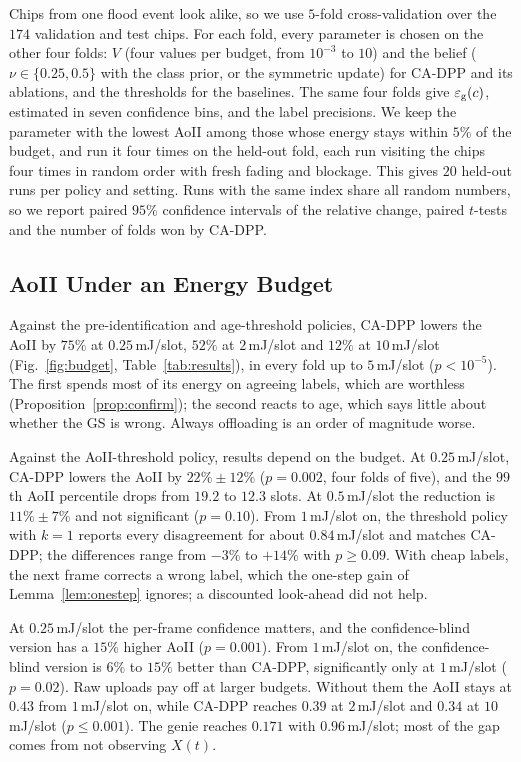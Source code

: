 \documentclass[conference]{IEEEtran}
\theoremstyle{remark}
\newcommand{\ee}{\varepsilon}
\begin{document}
Chips from one flood event look alike, so we use $5$-fold cross-validation over the $174$ validation and test chips. For each fold, every parameter is chosen on the other four folds: $V$ (four values per budget, from $10^{-3}$ to $10$) and the belief ($\nu\in\{0.25,0.5\}$ with the class prior, or the symmetric update) for CA-DPP and its ablations, and the thresholds for the baselines. The same four folds give $\ee_{\rm g}(c)$, estimated in seven confidence bins, and the label precisions. We keep the parameter with the lowest AoII among those whose energy stays within $5\%$ of the budget, and run it four times on the held-out fold, each run visiting the chips four times in random order with fresh fading and blockage. This gives $20$ held-out runs per policy and setting. Runs with the same index share all random numbers, so we report paired $95\%$ confidence intervals of the relative change, paired $t$-tests and the number of folds won by CA-DPP.

\subsection{AoII Under an Energy Budget}
Against the pre-identification and age-threshold policies, CA-DPP lowers the AoII by $75\%$ at $0.25$\,mJ/slot, $52\%$ at $2$\,mJ/slot and $12\%$ at $10$\,mJ/slot (Fig.~\ref{fig:budget}, Table~\ref{tab:results}), in every fold up to $5$\,mJ/slot ($p<10^{-5}$). The first spends most of its energy on agreeing labels, which are worthless (Proposition~\ref{prop:confirm}); the second reacts to age, which says little about whether the GS is wrong. Always offloading is an order of magnitude worse.

Against the AoII-threshold policy, results depend on the budget. At $0.25$\,mJ/slot, CA-DPP lowers the AoII by $22\%\pm12\%$ ($p=0.002$, four folds of five), and the $99$th AoII percentile drops from $19.2$ to $12.3$ slots. At $0.5$\,mJ/slot the reduction is $11\%\pm7\%$ and not significant ($p=0.10$). From $1$\,mJ/slot on, the threshold policy with $k=1$ reports every disagreement for about $0.84$\,mJ/slot and matches CA-DPP; the differences range from $-3\%$ to $+14\%$ with $p\ge0.09$. With cheap labels, the next frame corrects a wrong label, which the one-step gain of Lemma~\ref{lem:onestep} ignores; a discounted look-ahead did not help.

At $0.25$\,mJ/slot the per-frame confidence matters, and the confidence-blind version has a $15\%$ higher AoII ($p=0.001$). From $1$\,mJ/slot on, the confidence-blind version is $6\%$ to $15\%$ better than CA-DPP, significantly only at $1$\,mJ/slot ($p=0.02$). Raw uploads pay off at larger budgets. Without them the AoII stays at $0.43$ from $1$\,mJ/slot on, while CA-DPP reaches $0.39$ at $2$\,mJ/slot and $0.34$ at $10$\,mJ/slot ($p\le0.001$). The genie reaches $0.171$ with $0.96$\,mJ/slot; most of the gap comes from not observing $X(t)$.
\end{document}
